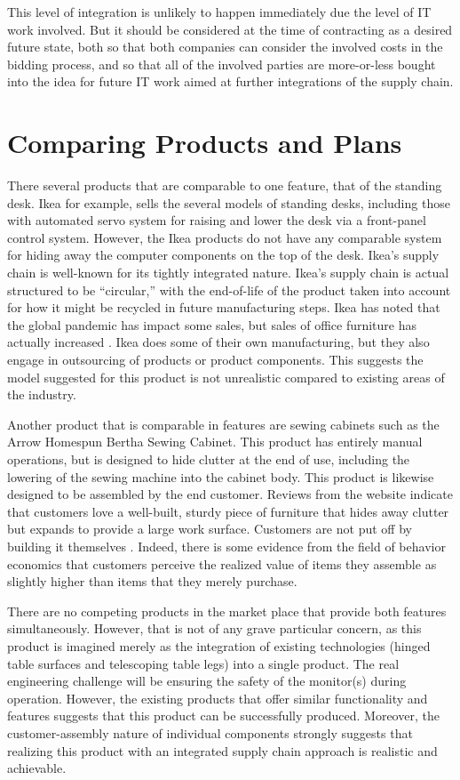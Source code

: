 \documentclass[man]{apa7}
\begin{document}
This level of integration is unlikely to happen immediately due the level of IT work involved. But it should be considered at the time of contracting as a desired future state, both so that both companies can consider the involved costs in the bidding process, and so that all of the involved parties are more-or-less bought into the idea for future IT work aimed at further integrations of the supply chain.

\section{Comparing Products and Plans}
\label{sec:org38c6244}

There several products that are comparable to one feature, that of the standing desk. Ikea for example, sells the several models of standing desks, including those with automated servo system for raising and lower the desk via a front-panel control system. However, the Ikea products do not have any comparable system for hiding away the computer components on the top of the desk. Ikea's supply chain is well-known for its tightly integrated nature. Ikea's supply chain is actual structured to be ``circular,'' with the end-of-life of the product taken into account for how it might be recycled in future manufacturing steps. Ikea has noted that the global pandemic has impact some sales, but sales of office furniture has actually increased \parencite{ScenesStrategicIkea}. Ikea does some of their own manufacturing, but they also engage in outsourcing of products or product components. This suggests the model suggested for this product is not unrealistic compared to existing areas of the industry.

Another product that is comparable in features are sewing cabinets such as the Arrow Homespun Bertha Sewing Cabinet. This product has entirely manual operations, but is designed to hide clutter at the end of use, including the lowering of the sewing machine into the cabinet body. This product is likewise designed to be assembled by the end customer. Reviews from the website indicate that customers love a well-built, sturdy piece of furniture that hides away clutter but expands to provide a large work surface. Customers are not put off by building it themselves \parencite{joann.comArrowHomespunBertha}. Indeed, there is some evidence from the field of behavior economics that customers perceive the realized value of items they assemble as slightly higher than items that they merely purchase.

There are no competing products in the market place that provide both features simultaneously. However, that is not of any grave particular concern, as this product is imagined merely as the integration of existing technologies (hinged table surfaces and telescoping table legs) into a single product. The real engineering challenge will be ensuring the safety of the monitor(s) during operation. However, the existing products that offer similar functionality and features suggests that this product can be successfully produced. Moreover, the customer-assembly nature of individual components strongly suggests that realizing this product with an integrated supply chain approach is realistic and achievable.
\end{document}
